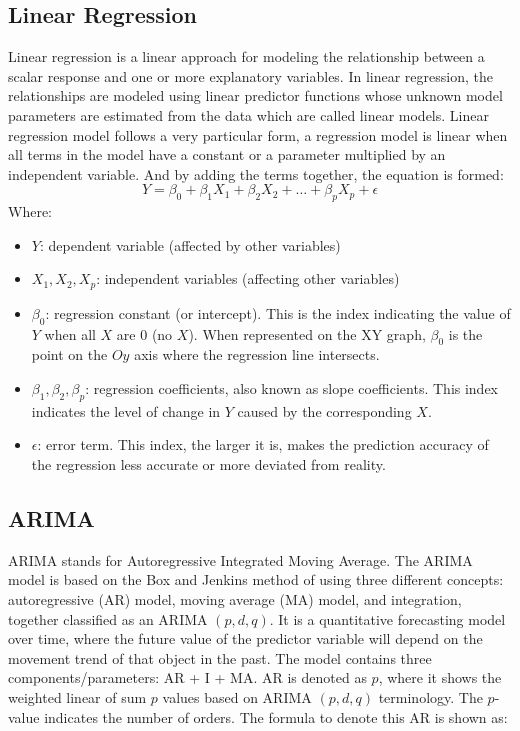 \documentclass[conference]{IEEEtran}
\begin{document}
\subsection{Linear Regression}
Linear regression is a linear approach for modeling the relationship between a scalar response and one or more explanatory variables. In linear regression, the relationships are modeled using linear predictor functions whose unknown model parameters are estimated from the data which are called linear models. Linear regression model follows a very particular form, a regression model is linear when all terms in the model have a constant or a parameter multiplied by an independent variable. And by adding the terms together, the equation is formed:
\[ Y = \beta_0 + \beta_1 X_1 + \beta_2 X_2 + \ldots + \beta_p X_p + \epsilon \]
Where:
\begin{itemize}
    \item $Y$: dependent variable (affected by other variables)
    \item $X_1, X_2, X_p$: independent variables (affecting other variables)
    \item $\beta_0$: regression constant (or intercept). This is the index indicating the value of $Y$ when all $X$ are 0 (no $X$). When represented on the XY graph, $\beta_0$ is the point on the $Oy$ axis where the regression line intersects.
    \item $\beta_1, \beta_2, \beta_p$: regression coefficients, also known as slope coefficients. This index indicates the level of change in $Y$ caused by the corresponding $X$.
    \item $\epsilon$: error term. This index, the larger it is, makes the prediction accuracy of the regression less accurate or more deviated from reality.
\end{itemize}

\subsection{ARIMA}

ARIMA stands for Autoregressive Integrated Moving Average. The ARIMA model is based on the Box and Jenkins method of using three different concepts: autoregressive (AR) model, moving average (MA) model, and integration, together classified as an ARIMA $(p, d, q)$. It is a quantitative forecasting model over time, where the future value of the predictor variable will depend on the movement trend of that object in the past. 
The model contains three components/parameters: AR + I + MA. AR is denoted as $p$, where it shows the weighted linear of sum $p$ values based on ARIMA $(p, d, q)$ terminology. The $p$-value indicates the number of orders. The formula to denote this AR is shown as:
\end{document}
